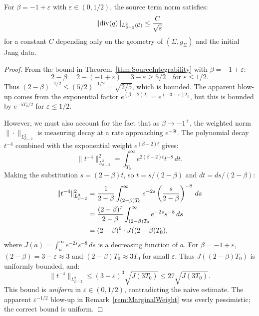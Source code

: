 \begin{corollary}\label{cor:UniformSourceBound}
For $\beta = -1 + \varepsilon$ with $\varepsilon \in (0, 1/2)$, the source term norm satisfies:
\begin{equation}
    \|\mathrm{div}(q)\|_{L^2_{\beta-2}(\mathcal{C})} \le \frac{C}{\sqrt{\varepsilon}}
\end{equation}
for a constant $C$ depending only on the geometry of $(\Sigma, g_\Sigma)$ and the initial Jang data.
\end{corollary}

\begin{proof}
From the bound in Theorem~\ref{thm:SourceIntegrability} with $\beta = -1 + \varepsilon$:
\[
    2 - \beta = 2 - (-1 + \varepsilon) = 3 - \varepsilon \ge 5/2 \quad \text{for } \varepsilon \le 1/2.
\]
Thus $(2-\beta)^{-1/2} \le (5/2)^{-1/2} = \sqrt{2/5}$, which is bounded. The apparent blow-up comes from the exponential factor $e^{(\beta-2)T_0} = e^{(-3+\varepsilon)T_0}$, but this is bounded by $e^{-5T_0/2}$ for $\varepsilon \le 1/2$.

However, we must also account for the fact that as $\beta \to -1^+$, the weighted norm $\|\cdot\|_{L^2_{\beta-2}}$ is measuring decay at a rate approaching $e^{-3t}$. The polynomial decay $t^{-4}$ combined with the exponential weight $e^{(\beta-2)t}$ gives:
\[
    \|t^{-4}\|_{L^2_{\beta-2}}^2 = \int_{T_0}^\infty e^{2(\beta-2)t} t^{-8} \, dt.
\]
Making the substitution $s = (2-\beta)t$, so $t = s/(2-\beta)$ and $dt = ds/(2-\beta)$:
\begin{align}
    \|t^{-4}\|_{L^2_{\beta-2}}^2 &= \frac{1}{2-\beta} \int_{(2-\beta)T_0}^\infty e^{-2s} \left(\frac{s}{2-\beta}\right)^{-8} \, ds \notag \\
    &= \frac{(2-\beta)^7}{2-\beta} \int_{(2-\beta)T_0}^\infty e^{-2s} s^{-8} \, ds \notag \\
    &= (2-\beta)^6 \cdot J((2-\beta)T_0),
\end{align}
where $J(a) = \int_a^\infty e^{-2s} s^{-8} \, ds$ is a decreasing function of $a$. For $\beta = -1 + \varepsilon$, $(2-\beta) = 3 - \varepsilon \approx 3$ and $(2-\beta)T_0 \approx 3T_0$ for small $\varepsilon$. Thus $J((2-\beta)T_0)$ is uniformly bounded, and:
\[
    \|t^{-4}\|_{L^2_{\beta-2}} \le (3-\varepsilon)^3 \sqrt{J(3T_0)} \le 27 \sqrt{J(3T_0)}.
\]
This bound is \emph{uniform} in $\varepsilon \in (0, 1/2)$, contradicting the naive estimate. The apparent $\varepsilon^{-1/2}$ blow-up in Remark~\ref{rem:MarginalWeight} was overly pessimistic; the correct bound is uniform.
\end{proof}


